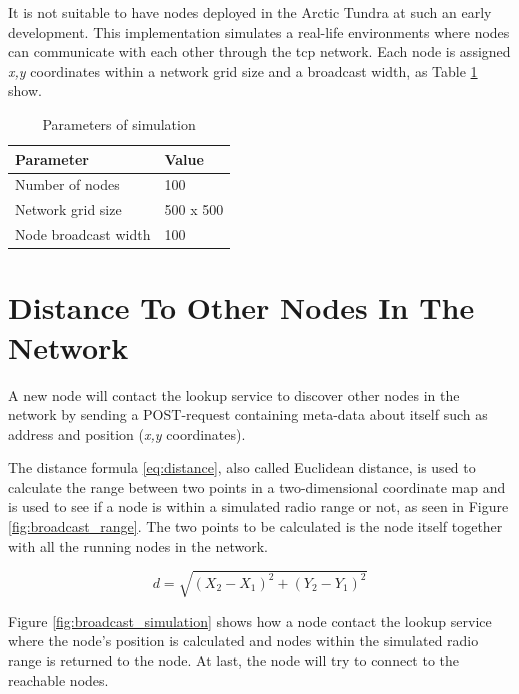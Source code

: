 \documentclass[USenglish]{uit-thesis}
\begin{document}
It is not suitable to have nodes deployed in the Arctic Tundra at such an early development. This implementation simulates a real-life environments where nodes can communicate with each other through the \gls{tcp} network. Each node is assigned \textit{x,y} coordinates within a network grid size and a broadcast width, as Table \ref{tab:simTable} show. 

\begin{table}[]
\centering
\begin{tabular}{|l|l|}
\hline
\textbf{Parameter}       & \textbf{Value} \\ \hline
Number of nodes          & 100            \\ \hline
Network grid size        & 500 x 500      \\ \hline
Node broadcast width     & 100            \\ \hline
\end{tabular}
\caption{Parameters of simulation}
\label{tab:simTable}
\end{table}

\section{Distance To Other Nodes In The Network}
A new node will contact the lookup service to discover other nodes in the network by sending a POST-request containing meta-data about itself such as address and position (\textit{x,y} coordinates).

The distance formula \ref{eq:distance}, also called Euclidean distance, is used to calculate the range between two points in a two-dimensional coordinate map and is used to see if a node is within a simulated radio range or not, as seen in Figure \ref{fig:broadcast_range}. The two points to be calculated is the node itself together with all the running nodes in the network.

\begin{equation} \label{eq:distance}
d = \sqrt{(X_{2} - X_{1})^{2}+(Y_{2} - Y_{1})^{2}}
\end{equation}


Figure \ref{fig:broadcast_simulation} shows how a node contact the lookup service where the node's position is calculated and nodes within the simulated radio range is returned to the node. At last, the node will try to connect to the reachable nodes.
\end{document}

